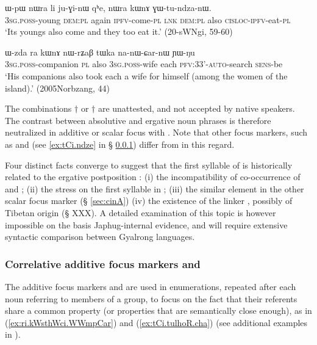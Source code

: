   \begin{exe}
\ex \label{ex:nWra.kWnA}
\gll ɯ-pɯ nɯra li ju-ɣi-nɯ qʰe, nɯra kɯnɤ ɣɯ-tu-ndza-nɯ. \\
\textsc{3sg}.\textsc{poss}-young \textsc{dem}:\textsc{pl} again \textsc{ipfv}-come-\textsc{pl} \textsc{lnk} \textsc{dem}:\textsc{pl} also \textsc{cisloc}-\textsc{ipfv}-eat-\textsc{pl} \\
\glt `Its youngs also come and they too eat it.' (20-sWNgi, 59-60)
  \end{exe}
  
    \begin{exe}
\ex \label{ex:Wzda.ra.kWnA}
\gll   ɯ-zda ra kɯnɤ nɯ-rʑaβ tɯka na-nɯ-ɕar-nɯ ɲɯ-ŋu \\
\textsc{3sg}.\textsc{poss}-companion \textsc{pl} also \textsc{3sg}.\textsc{poss}-wife each \textsc{pfv}:3\fl{}3'-\textsc{auto}-search \textsc{sens}-be \\
\glt `His companions also took each a wife for himself (among the women of the island).' (2005Norbzang, 44)
    \end{exe}
    
The combinations $\dagger$ or $\dagger$ are unattested, and not accepted by native speakers. The contrast between absolutive and ergative noun phrases is therefore neutralized in additive or scalar focus with . Note that other focus markers, such as  and  (see \ref{ex:tCi.ndze} in § \ref{sec:ri.additive}) differ from  in this regard.

Four distinct facts converge to suggest that the first syllable of  is historically related to the ergative postposition : (i) the incompatibility of co-occurrence of  and ; (ii) the stress on the first syllable in ; (iii) the similar  element in the other scalar focus marker  (§ \ref{sec:cinA}) (iv) the existence of the linker , possibly of Tibetan origin (§ XXX). A detailed examination of this topic is however impossible on the basis Japhug-internal evidence, and will require extensive syntactic comparison between Gyalrong languages.

 \subsubsection{Correlative additive focus markers  and } \label{sec:ri.additive} 
 The additive focus markers  and   are used in enumerations, repeated after each noun referring to  members of a group, to focus on the fact that their referents share a common property (or properties that are semantically close enough), as in (\ref{ex:ri.kWsthWci.WWmpCar}) and (\ref{ex:tCi.tulhoR.cha}) (see additional examples in \citealt[313-314]{jacques14linking}).
 
